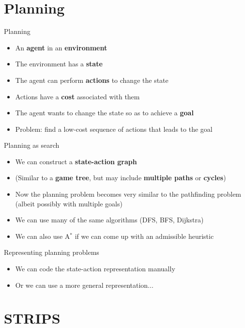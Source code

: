 \part{Planning}
\frame{\partpage}

\begin{frame}{Planning}
	\begin{itemize}
		\pause\item An \textbf{agent} in an \textbf{environment}
		\pause\item The environment has a \textbf{state}
		\pause\item The agent can perform \textbf{actions} to change the state
		\pause\item Actions have a \textbf{cost} associated with them
		\pause\item The agent wants to change the state so as to achieve a \textbf{goal}
		\pause\item Problem: find a low-cost sequence of actions that leads to the goal
	\end{itemize}
\end{frame}

\begin{frame}{Planning as search}
	\begin{itemize}
		\pause\item We can construct a \textbf{state-action graph}
		\pause\item (Similar to a \textbf{game tree}, but may include \textbf{multiple paths} or \textbf{cycles})
		\pause\item Now the planning problem becomes very similar to the pathfinding problem (albeit possibly with multiple goals)
		\pause\item We can use many of the same algorithms (DFS, BFS, Dijkstra)
		\pause\item We can also use A$^*$ if we can come up with an admissible heuristic
	\end{itemize}
\end{frame}

\begin{frame}{Representing planning problems}
	\begin{itemize}
		\pause\item We can code the state-action representation manually
		\pause\item Or we can use a more general representation...
	\end{itemize}
\end{frame}

\part{STRIPS}
\frame{\partpage}

